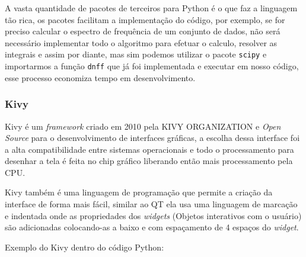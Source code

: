             A vasta quantidade de pacotes de terceiros para Python é o que faz a linguagem tão rica, os 
            pacotes facilitam a implementação do código, por exemplo, se for preciso calcular o espectro de 
            frequência de um conjunto de dados, não será necessário implementar todo o algoritmo para efetuar o calculo, resolver as integrais e assim por diante, mas sim podemos utilizar o pacote \verb|scipy| e importarmos a função \verb|dnff| que já foi implementada e executar em nosso código, esse processo economiza tempo em desenvolvimento.           
            
            \subsubsection{Kivy}
            
            
            \label{lim_kivy}
            Kivy é um \textit{framework} criado em 2010 pela KIVY ORGANIZATION \cite{kivy} e \textit{Open Source} para o desenvolvimento de interfaces gráficas, a escolha dessa interface foi a alta compatibilidade entre sistemas operacionais e todo o processamento para desenhar a tela é feita no chip gráfico liberando então mais processamento pela CPU.
            
            Kivy também é uma linguagem de programação que permite a criação da interface de forma mais fácil, similar ao QT \cite{qt} ela usa uma linguagem de marcação e indentada onde as propriedades dos \textit{widgets} (Objetos interativos com o usuário) são adicionadas colocando-as a baixo e com espaçamento de 4 espaços do \textit{widget}. 
                        
            Exemplo do Kivy dentro do código Python:
            \begin{quote}
                                                                                 
            \end{quote}
            
